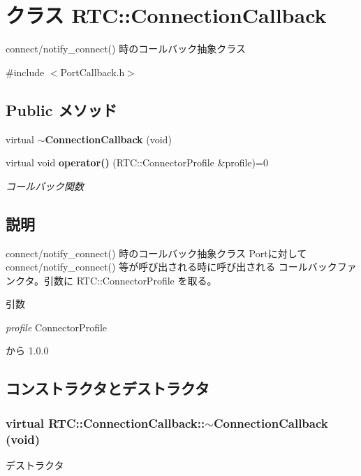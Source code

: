 \section{クラス RTC::ConnectionCallback}
\label{classRTC_1_1ConnectionCallback}


connect/notify\_\-connect() 時のコールバック抽象クラス  




{\ttfamily \#include $<$PortCallback.h$>$}

\subsection*{Public メソッド}
\begin{DoxyCompactItemize}
\item 
virtual {\bf $\sim$ConnectionCallback} (void)
\item 
virtual void {\bf operator()} (RTC::ConnectorProfile \&profile)=0
\begin{DoxyCompactList}\small\item\em コールバック関数 \item\end{DoxyCompactList}\end{DoxyCompactItemize}


\subsection{説明}
connect/notify\_\-connect() 時のコールバック抽象クラス Portに対してconnect/notify\_\-connect() 等が呼び出される時に呼び出される コールバックファンクタ。引数に RTC::ConnectorProfile を取る。


\begin{DoxyParams}{引数}
\item[{\em profile}]ConnectorProfile\end{DoxyParams}
\begin{DoxySince}{から}
1.0.0 
\end{DoxySince}


\subsection{コンストラクタとデストラクタ}
\subsubsection[{$\sim$ConnectionCallback}]{\setlength{\rightskip}{0pt plus 5cm}virtual RTC::ConnectionCallback::$\sim$ConnectionCallback (void)\hspace{0.3cm}{\ttfamily  [inline, virtual]}}\label{classRTC_1_1ConnectionCallback_a8ce9ddf57298521257e45003717763df}
デストラクタ 

